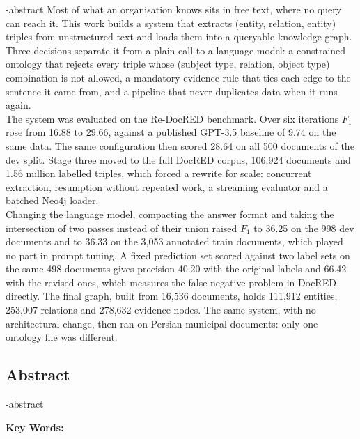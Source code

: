 
\en-abstract{
Most of what an organisation knows sits in free text, where no query can reach it. This work builds a system that extracts (entity, relation, entity) triples from unstructured text and loads them into a queryable knowledge graph. Three decisions separate it from a plain call to a language model: a constrained ontology that rejects every triple whose (subject type, relation, object type) combination is not allowed, a mandatory evidence rule that ties each edge to the sentence it came from, and a pipeline that never duplicates data when it runs again.
\\
The system was evaluated on the Re-DocRED benchmark. Over six iterations $F_1$ rose from 16.88 to 29.66, against a published GPT-3.5 baseline of 9.74 on the same data. The same configuration then scored 28.64 on all 500 documents of the dev split. Stage three moved to the full DocRED corpus, 106,924 documents and 1.56 million labelled triples, which forced a rewrite for scale: concurrent extraction, resumption without repeated work, a streaming evaluator and a batched Neo4j loader.
\\
Changing the language model, compacting the answer format and taking the intersection of two passes instead of their union raised $F_1$ to 36.25 on the 998 dev documents and to 36.33 on the 3,053 annotated train documents, which played no part in prompt tuning. A fixed prediction set scored against two label sets on the same 498 documents gives precision 40.20 with the original labels and 66.42 with the revised ones, which measures the false negative problem in DocRED directly. The final graph, built from 16,536 documents, holds 111,912 entities, 253,007 relations and 278,632 evidence nodes. The same system, with no architectural change, then ran on Persian municipal documents: only one ontology file was different.
}

\newpage
\thispagestyle{empty}
\begin{latin}
\section*{\LARGE\centering Abstract}

\een-abstract

\vspace*{.5cm}
{\large\textbf{Key Words:}}\par
\vspace*{.5cm}
\elatinkeywords
\end{latin}
